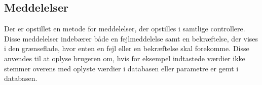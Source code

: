 \subsection*{Meddelelser}
Der er opstillet en metode for meddelelser, der opstilles i samtlige controllere. Disse meddelelser indebærer både en fejlmeddelelse samt en bekræftelse, der vises i den grænseflade, hvor enten en fejl eller en bekræftelse skal forekomme.
Disse anvendes til at oplyse brugeren om, hvis for eksempel indtastede værdier ikke stemmer overens med oplyste værdier i databasen eller parametre er gemt i databasen.  